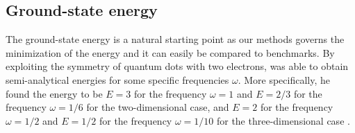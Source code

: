 \subsection{Ground-state energy} \label{sec:groundstateenergy}
The ground-state energy is a natural starting point as our methods governs the minimization of the energy and it can easily be compared to benchmarks. By exploiting the symmetry of quantum dots with two electrons, \citeauthor{taut_two_1993} was able to obtain semi-analytical energies for some specific frequencies $\omega$. More specifically, he found the energy to be $E=3$ for the frequency $\omega=1$ and $E=2/3$ for the frequency $\omega=1/6$ for the two-dimensional case, and $E=2$ for the frequency $\omega=1/2$ and $E=1/2$ for the frequency $\omega=1/10$ for the three-dimensional case \cite{taut_two_1993,taut_two_1994}.

